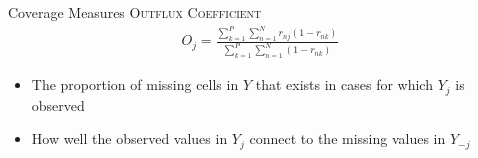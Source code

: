 \documentclass{beamer}\usepackage[]{graphicx}\usepackage[]{color}
\newcommand{\rmsc}[1]{\textrm{\textsc{#1}}}
\begin{document}
\begin{frame}[allowframebreaks]{Coverage Measures}
  \rmsc{Outflux Coefficient}
  \begin{align*}
    O_j = \frac{\sum_{k = 1}^P \sum_{n = 1}^N r_{nj}(1 - r_{nk})}{\sum_{k = 1}^P \sum_{n = 1}^N (1 - r_{nk})}
  \end{align*}
  \begin{itemize}
  \item The proportion of missing cells in $Y$ that exists in cases for which
    $Y_j$ is observed
  \item How well the observed values in $Y_j$ connect to the missing values in
    $Y_{-j}$
  \end{itemize}

\end{frame}

\watermarkoff %
\end{document}
